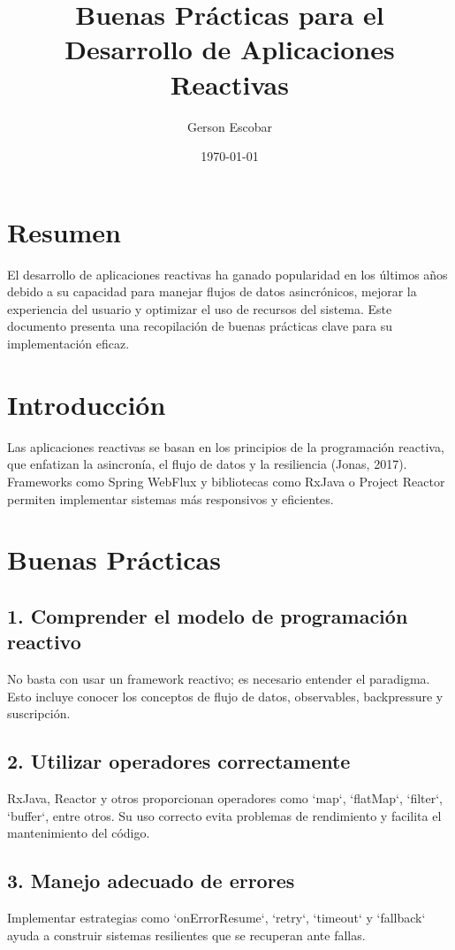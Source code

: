 \documentclass[12pt]{article}
\title{\textbf{Buenas Prácticas para el Desarrollo de Aplicaciones Reactivas}}
\author{Gerson Escobar}
\date{\today}
\begin{document}
\maketitle

\section*{Resumen}
El desarrollo de aplicaciones reactivas ha ganado popularidad en los últimos años debido a su capacidad para manejar flujos de datos asincrónicos, mejorar la experiencia del usuario y optimizar el uso de recursos del sistema. Este documento presenta una recopilación de buenas prácticas clave para su implementación eficaz.

\section{Introducción}
Las aplicaciones reactivas se basan en los principios de la programación reactiva, que enfatizan la asincronía, el flujo de datos y la resiliencia (Jonas, 2017). Frameworks como Spring WebFlux y bibliotecas como RxJava o Project Reactor permiten implementar sistemas más responsivos y eficientes.

\section{Buenas Prácticas}

\subsection{1. Comprender el modelo de programación reactivo}
No basta con usar un framework reactivo; es necesario entender el paradigma. Esto incluye conocer los conceptos de flujo de datos, observables, backpressure y suscripción.

\subsection{2. Utilizar operadores correctamente}
RxJava, Reactor y otros proporcionan operadores como `map`, `flatMap`, `filter`, `buffer`, entre otros. Su uso correcto evita problemas de rendimiento y facilita el mantenimiento del código.

\subsection{3. Manejo adecuado de errores}
Implementar estrategias como `onErrorResume`, `retry`, `timeout` y `fallback` ayuda a construir sistemas resilientes que se recuperan ante fallas.
\end{document}
